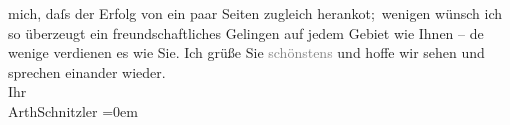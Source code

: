 \begin{ledgroupsized}[t]{13cm}
                    mich, daſs der Erfolg von ein paar Seiten zugleich heranko{\geminationm}t; wenigen wünsch ich so überzeugt ein
                    freundschaftliches Gelingen auf jedem Gebiet wie Ihnen – de{\geminationn} wenige verdienen es wie Sie.\pend
           \pstart
           Ich grüße Sie \textcolor{gray}{schönstens} und hoffe wir sehen und sprechen
                    einander wieder.{\\[\baselineskip]}Ihr{\\[\baselineskip]}\spacefill\mbox{ArthSchnitzler}\pend
           \leftskip=0em{}
         
         \endnumbering{}\end{ledgroupsized}  \newcommand{\dateiname}{L02536}\newcommand{\titel}{Arthur Schnitzler an Robert Adam, 12. 6. 1930}\newcommand{\editorInnen}{Martin Anton Müller und Gerd-Hermann Susen}
      
